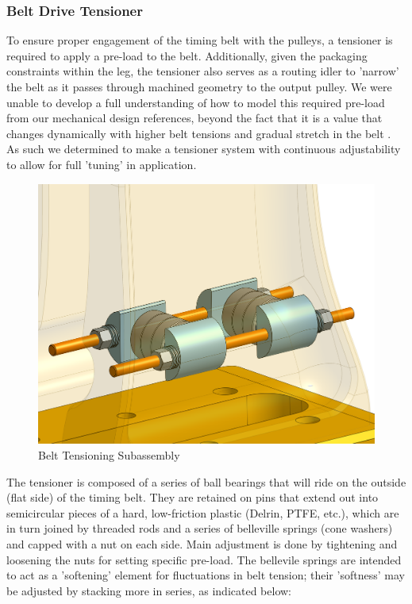 \documentclass{article}
\begin{document}
\subsubsection{Belt Drive Tensioner}

To ensure proper engagement of the timing belt with the pulleys, a tensioner is required to apply a pre-load to the belt. Additionally, given the packaging constraints within the leg, the tensioner also serves as a routing idler to 'narrow' the belt as it passes through machined geometry to the output pulley. We were unable to develop a full understanding of how to model this required pre-load from our mechanical design references, beyond the fact that it is a value that changes dynamically with higher belt tensions and gradual stretch in the belt \cite{Shigley}. As such we determined to make a tensioner system with continuous adjustability to allow for full 'tuning' in application.

\begin{figure}
    \centering
    \includegraphics[width=0.75\linewidth]{assets/MOHRA/Sub-Leg/LegAssem_tensioner.png}
    \caption{Belt Tensioning Subassembly}
    \label{fig:enter-label}
\end{figure}

The tensioner is composed of a series of ball bearings that will ride on the outside (flat side) of the timing belt. They are retained on pins that extend out into semicircular pieces of a hard, low-friction plastic (Delrin, PTFE, etc.), which are in turn joined by threaded rods and a series of belleville springs (cone washers) and capped with a nut on each side. Main adjustment is done by tightening and loosening the nuts for setting specific pre-load. The bellevile springs are intended to act as a 'softening' element for fluctuations in belt tension; their 'softness' may be adjusted by stacking more in series, as indicated below:
\end{document}
